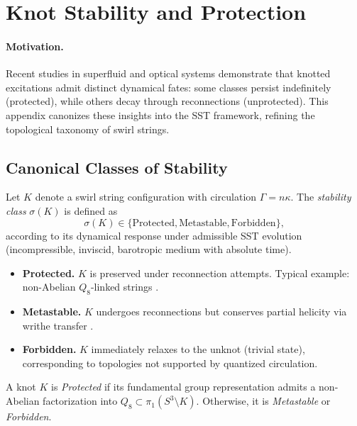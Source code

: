 \documentclass[10pt,reprint,aps,onecolumn,nofootinbib]{revtex4-2}
\begin{document}
\section{Knot Stability and Protection}
\label{app:knot_protection}

\paragraph{Motivation.}
    Recent studies in superfluid and optical systems demonstrate that knotted excitations admit distinct dynamical fates: some classes persist indefinitely (protected), while others decay through reconnections (unprotected). This appendix canonizes these insights into the SST framework, refining the topological taxonomy of swirl strings.

\subsection{Canonical Classes of Stability}

\begin{definition}
    Let $K$ denote a swirl string configuration with circulation $\Gamma = n \kappa$. The \emph{stability class} $\sigma(K)$ is defined as
    \[
        \sigma(K) \in \{ \text{Protected}, \text{Metastable}, \text{Forbidden} \},
    \]
    according to its dynamical response under admissible SST evolution (incompressible, inviscid, barotropic medium with absolute time).
\end{definition}

\begin{itemize}
    \item \textbf{Protected.} $K$ is preserved under reconnection attempts. Typical example: non-Abelian $Q_8$-linked strings \cite{Annala2025}.
    \item \textbf{Metastable.} $K$ undergoes reconnections but conserves partial helicity via writhe transfer \cite{Kleckner2016}.
    \item \textbf{Forbidden.} $K$ immediately relaxes to the unknot (trivial state), corresponding to topologies not supported by quantized circulation.
\end{itemize}

\begin{corollary}
    A knot $K$ is \emph{Protected} if its fundamental group representation admits a non-Abelian factorization into $Q_8 \subset \pi_1(S^3 \setminus K)$. Otherwise, it is \emph{Metastable} or \emph{Forbidden}.
\end{corollary}
\end{document}
